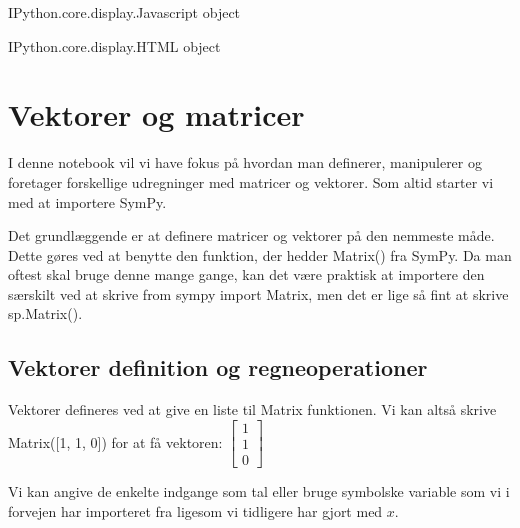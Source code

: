 \documentclass[letterpaper,10pt,english]{jupyterBook}
\begin{document}
\begin{sphinxVerbatim}[commandchars=\\\{\}]
\PYGZlt{}IPython.core.display.Javascript object\PYGZgt{}
\end{sphinxVerbatim}

\begin{sphinxVerbatim}[commandchars=\\\{\}]
\PYGZlt{}IPython.core.display.HTML object\PYGZgt{}
\end{sphinxVerbatim}


\section{Vektorer og matricer}
\label{\detokenize{notebooks/sympy/Notebook_LinAlg1:vektorer-og-matricer}}\label{\detokenize{notebooks/sympy/Notebook_LinAlg1::doc}}
I denne notebook vil vi have fokus på hvordan man definerer, manipulerer og foretager forskellige udregninger med matricer og vektorer. Som altid starter vi med at importere SymPy.

\begin{sphinxVerbatim}[commandchars=\\\{\}]
                       
\end{sphinxVerbatim}

Det grundlæggende er at definere matricer og vektorer på den nemmeste måde. Dette gøres ved at benytte den funktion, der hedder Matrix() fra SymPy. Da man oftest skal bruge denne mange gange, kan det være praktisk at importere den særskilt ved at skrive from sympy import Matrix, men det er lige så fint at skrive sp.Matrix().


\subsection{Vektorer \sphinxhyphen{} definition og regneoperationer}
\label{\detokenize{notebooks/sympy/Notebook_LinAlg1:vektorer-definition-og-regneoperationer}}
Vektorer defineres ved at give en liste til Matrix funktionen. Vi kan altså skrive Matrix({[}1, 1, 0{]}) for at få vektoren:
\(\displaystyle \left[\begin{matrix}1\\1\\0\end{matrix}\right]\)

Vi kan angive de enkelte indgange som tal eller bruge symbolske variable som vi i forvejen har importeret fra  ligesom vi tidligere har gjort med \(x\).
\end{document}
